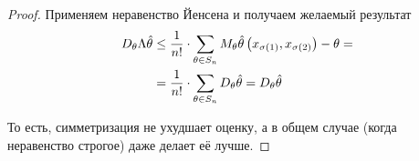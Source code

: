 \begin{proof}
    Применяем неравенство Йенсена и получаем желаемый результат
    \begin{align*}
        D_{\theta} \Lambda\hat{\theta}
            &\le\frac{1}{n!}\cdot\sum_{\theta\in S_n}M_{\theta} 
                \hat{\theta}\left(x_{\sigma\left(1\right)},
                    x_{\sigma\left(2\right)}\right)
                    -\theta=\\
            &=\frac{1}{n!}\cdot\sum_{\theta\in S_n}
                D_{\theta} \hat{\theta}
            =D_{\theta} \hat{\theta}
    \end{align*}

    То есть, симметризация не ухудшает оценку,
    а в общем случае (когда неравенство строгое) даже делает её лучше.
\end{proof}
